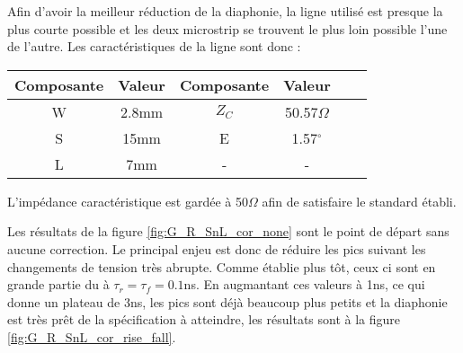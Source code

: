 
Afin d'avoir la meilleur réduction de la diaphonie, la ligne utilisé est presque la plus courte possible et les deux microstrip se trouvent le plus loin possible l'une de l'autre. Les caractéristiques de la ligne sont donc :

\begin{center}
 \label{tab:carac_line}
\begin{tabular}{c*{1}c| c*{3}c}
\toprule
Composante	&Valeur	&Composante	&Valeur\\ 
\midrule
\midrule
W	&2.8mm	&$Z_C$	&50.57$\Omega$\\
S	&15mm	&E		&1.57$^{\circ}$\\
L	&7mm	&-		&-\\
\bottomrule
\end{tabular}
\end{center}
L'impédance caractéristique est gardée à 50$\Omega$ afin de satisfaire le standard établi.

\vspace{0.3cm}
\vspace{0.3cm}

Les résultats de la figure \ref{fig:G_R_SnL_cor_none} sont le point de départ sans aucune correction.
Le principal enjeu est donc de réduire les pics suivant les changements de tension très abrupte. Comme établie plus tôt, ceux ci sont en grande partie du à $\tau_r = \tau_f = 0.1$ns. 
En augmantant ces valeurs à 1ns, ce qui donne un plateau de 3ns, les pics sont déjà beaucoup plus petits et la diaphonie est très prêt de la spécification à atteindre, les résultats sont à la figure \ref{fig:G_R_SnL_cor_rise_fall}.

\vspace{0.3cm}
\vspace{0.3cm}

